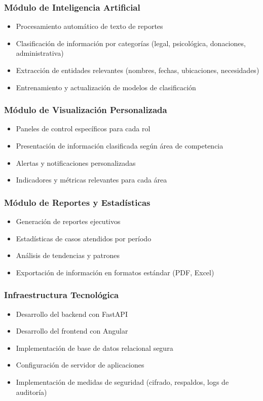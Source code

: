 \documentclass[12pt,letterpaper]{article}
\begin{document}
\subsubsection{Módulo de Inteligencia Artificial}
\begin{itemize}
    \item Procesamiento automático de texto de reportes
    \item Clasificación de información por categorías (legal, psicológica, donaciones, administrativa)
    \item Extracción de entidades relevantes (nombres, fechas, ubicaciones, necesidades)
    \item Entrenamiento y actualización de modelos de clasificación
\end{itemize}

\subsubsection{Módulo de Visualización Personalizada}
\begin{itemize}
    \item Paneles de control específicos para cada rol
    \item Presentación de información clasificada según área de competencia
    \item Alertas y notificaciones personalizadas
    \item Indicadores y métricas relevantes para cada área
\end{itemize}

\subsubsection{Módulo de Reportes y Estadísticas}
\begin{itemize}
    \item Generación de reportes ejecutivos
    \item Estadísticas de casos atendidos por período
    \item Análisis de tendencias y patrones
    \item Exportación de información en formatos estándar (PDF, Excel)
\end{itemize}

\subsubsection{Infraestructura Tecnológica}
\begin{itemize}
    \item Desarrollo del backend con FastAPI
    \item Desarrollo del frontend con Angular
    \item Implementación de base de datos relacional segura
    \item Configuración de servidor de aplicaciones
    \item Implementación de medidas de seguridad (cifrado, respaldos, logs de auditoría)
\end{itemize}
\end{document}
